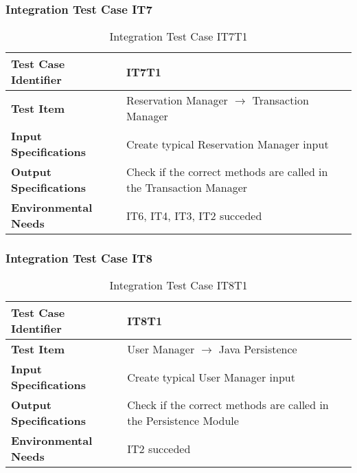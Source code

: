 \subsubsection{Integration Test Case IT7} \label{sssec:IT7}
\vspace{16pt}
\begin{table}[htbp]
\begin{center}
\renewcommand{\arraystretch}{1.5}
\begin{tabular}{l|p{}}
\hline
\textbf{Test Case Identifier} & IT7T1\\
\hline
\textbf{Test Item} & Reservation Manager $\rightarrow$ Transaction Manager\\
\hline
\textbf{Input Specifications} & Create typical Reservation Manager input \\
\hline
\textbf{Output Specifications} & Check if the correct methods are called in the Transaction Manager \\
\hline
\textbf{Environmental Needs} & IT6, IT4, IT3, IT2 succeded\\
\hline
\end{tabular}
\caption{Integration Test Case IT7T1}
\end{center}
\end{table}

\vspace{10pt}
\subsubsection{Integration Test Case IT8} \label{sssec:IT8}
\vspace{16pt}
\begin{table}[htbp]
\begin{center}
\renewcommand{\arraystretch}{1.5}
\begin{tabular}{l|p{}}
\hline
\textbf{Test Case Identifier} & IT8T1\\
\hline
\textbf{Test Item} & User Manager $\rightarrow$ Java Persistence\\
\hline
\textbf{Input Specifications} & Create typical User Manager input \\
\hline
\textbf{Output Specifications} & Check if the correct methods are called in the Persistence Module \\
\hline
\textbf{Environmental Needs} & IT2 succeded\\
\hline
\end{tabular}
\caption{Integration Test Case IT8T1}
\end{center}
\end{table}
\clearpage

